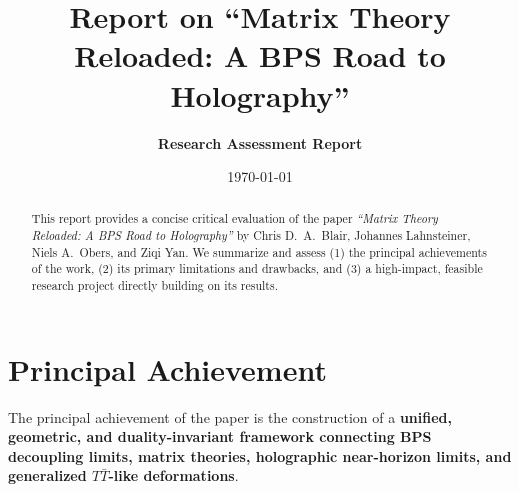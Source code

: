 \documentclass[11pt,a4paper]{article}
\title{\textbf{Report on ``Matrix Theory Reloaded: A BPS Road to Holography''}}
\author{\textbf{Research Assessment Report}}
\date{\today}
\begin{document}
\maketitle

\begin{abstract}
This report provides a concise critical evaluation of the paper \emph{``Matrix Theory Reloaded: A BPS Road to Holography''} by Chris D.~A.~Blair, Johannes Lahnsteiner, Niels A.~Obers, and Ziqi Yan. We summarize and assess (1) the principal achievements of the work, (2) its primary limitations and drawbacks, and (3) a high-impact, feasible research project directly building on its results.
\end{abstract}

\section{Principal Achievement}

The principal achievement of the paper is the construction of a \textbf{unified, geometric, and duality-invariant framework connecting BPS decoupling limits, matrix theories, holographic near-horizon limits, and generalized $T\bar{T}$-like deformations}. 
\end{document}
